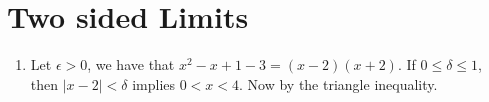 
\section{Two sided Limits}

\begin{enumerate}[label=(\arabic*)]
    \item
        \begin{enumerate}
            Let $\epsilon>0$, we have that  $x^2-x+1-3=(x-2)(x+2)$. If  $0 \leq \delta \leq 1$, then 
            $|x-2|<\delta$ implies  $0<x<4$. Now by the triangle inequality.
        \end{enumerate}
\end{enumerate}

